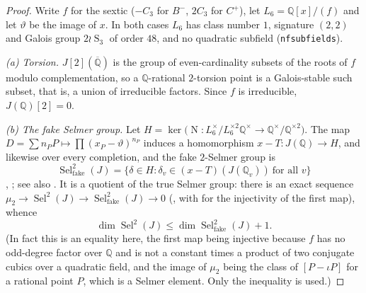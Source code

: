 \documentclass[11pt,reqno]{amsart}
\theoremstyle{plain}
\theoremstyle{definition}
\newcommand{\Q}{\mathbb{Q}}
\newcommand{\Qbar}{\overline{\Q}}
\DeclareMathOperator{\Sel}{Sel}
\DeclareMathOperator{\Nm}{N}
\DeclareMathOperator{\Sym}{S}
\newcommand{\fake}{\mathrm{fake}}
\numberwithin{equation}{section}
\begin{document}
\begin{proof}
Write $f$ for the sextic ($-C_{3}$ for $B^{-}$, $2C_{3}$ for $C^{+}$), let
$L_{6}=\Q[x]/(f)$ and let $\vartheta$ be the image of $x$. In both cases $L_{6}$
has class number $1$, signature $(2,2)$ and Galois group $2\wr \Sym_{3}$ of order
$48$, and no quadratic subfield (\texttt{nfsubfields}).

\emph{(a) Torsion.} $J[2](\Qbar)$ is the group of even-cardinality subsets of the
roots of $f$ modulo complementation, so a $\Q$-rational $2$-torsion point is a
Galois-stable such subset, that is, a union of irreducible factors. Since $f$ is
irreducible, $J(\Q)[2]=0$.

\emph{(b) The fake Selmer group.} Let
$H=\ker\bigl(\Nm\colon L_{6}^{\times}/L_{6}^{\times2}\Q^{\times}\to\Q^{\times}/\Q^{\times2}\bigr)$.
The map $D=\sum n_{P}P\mapsto\prod(x_{P}-\vartheta)^{n_{P}}$ induces a
homomorphism $x-T\colon J(\Q)\to H$, and likewise over every completion, and the
fake $2$-Selmer group is
\[
  \Sel^{2}_{\fake}(J)=\{\delta\in H:\delta_{v}\in(x-T)(J(\Q_{v}))\ \text{for all }v\}
\]
\cite[\S\S12--13]{PoonenSchaefer}, \cite[\S5]{Stoll2001}; see also
\cite{Creutz}. It is a quotient of the
true Selmer group: there is an exact sequence
$\mu_{2}\to\Sel^{2}(J)\to\Sel^{2}_{\fake}(J)\to0$
(\cite[\S5]{StollvanLuijk}, with \cite[Thm.~13.2]{PoonenSchaefer} for the
injectivity of the first map), whence
\[
  \dim\Sel^{2}(J)\le\dim\Sel^{2}_{\fake}(J)+1 .
\]
(In fact this is an equality here, the first map being injective because $f$ has
no odd-degree factor over $\Q$ and is not a constant times a product of two
conjugate cubics over a quadratic field, and the image of $\mu_{2}$ being the
class of $[P-\iota P]$ for a rational point $P$, which is a Selmer element. Only
the inequality is used.)


\end{proof}
\end{document}
